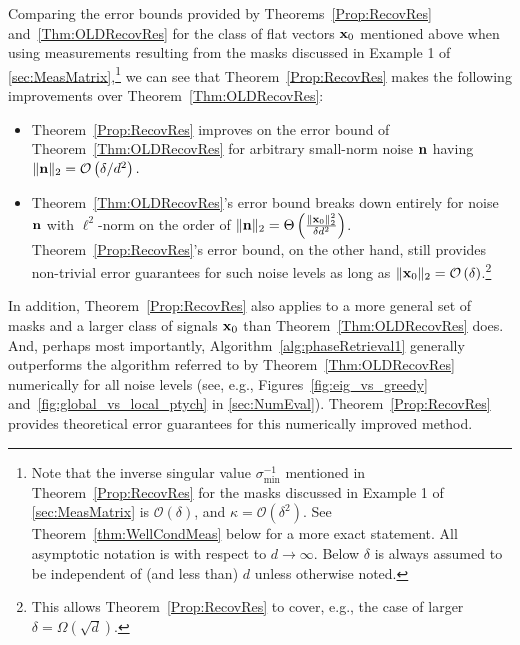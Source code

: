 Comparing the error bounds provided by Theorems~\ref{Prop:RecovRes} and~\ref{Thm:OLDRecovRes} for the class of flat vectors $\mathbf x_0$ mentioned above when using measurements resulting from the masks discussed in Example 1 of \cref{sec:MeasMatrix},\footnote{Note that the inverse singular value $\sigma_{\min}^{-1}$ mentioned in Theorem~\ref{Prop:RecovRes} for the masks discussed in Example 1 of \cref{sec:MeasMatrix} is $\mathcal{O}(\delta)$, and $\kappa = \mathcal{O}(\delta^2)$.  See Theorem~\ref{thm:WellCondMeas} below for a more exact statement.  All asymptotic notation is with respect to $d \rightarrow \infty$.  Below $\delta$ is always assumed to be independent of (and less than) $d$ unless otherwise noted.} we can see that  Theorem~\ref{Prop:RecovRes} makes the following improvements over Theorem~\ref{Thm:OLDRecovRes}:
\begin{itemize}
\item Theorem~\ref{Prop:RecovRes} improves on the error bound of Theorem~\ref{Thm:OLDRecovRes} for arbitrary small-norm noise $\mathbf n$ having $\| \mathbf n \|_2 = \mathcal{O} \left( \delta / d^2 \right).$
\item Theorem~\ref{Thm:OLDRecovRes}'s error bound breaks down entirely for noise $\mathbf n$ with $\ell^2$-norm on the order of $\| \mathbf n \|_2 = \Theta \left( \frac{\| \mathbf x_0 \|^2_2}{\delta d^2} \right)$.   Theorem~\ref{Prop:RecovRes}'s error bound, on the other hand, still provides non-trivial error guarantees for such noise levels as long as $\| \mathbf x_0 \|_2 = \mathcal{O}\left( \delta \right)$.\footnote{This allows Theorem~\ref{Prop:RecovRes} to cover, e.g., the case of larger $\delta = \Omega \left( \sqrt{d} \right)$.}
\end{itemize}
In addition, Theorem~\ref{Prop:RecovRes} also applies to a more general set of masks and a larger class of signals $\mathbf x_0$ than Theorem~\ref{Thm:OLDRecovRes} does.  And, perhaps most importantly, Algorithm~\ref{alg:phaseRetrieval1} generally outperforms the algorithm referred to by Theorem~\ref{Thm:OLDRecovRes} numerically for all noise levels (see, e.g., Figures~\ref{fig:eig_vs_greedy} and~\ref{fig:global_vs_local_ptych} in \cref{sec:NumEval}).  Theorem~\ref{Prop:RecovRes} provides theoretical error guarantees for this numerically improved method.

